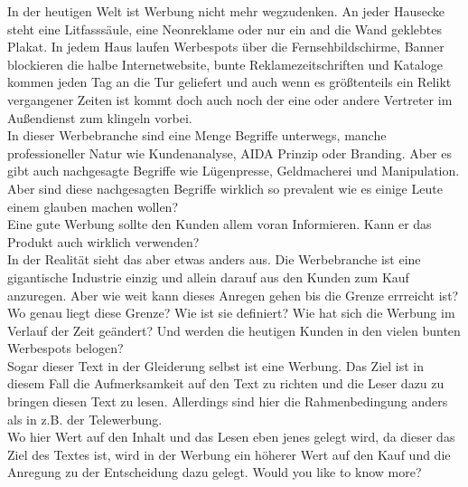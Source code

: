 \begin{refsection}
  
  
  In der heutigen Welt ist Werbung nicht mehr wegzudenken. An jeder Hausecke steht eine Litfasssäule, eine Neonreklame oder nur ein and die Wand geklebtes Plakat. In jedem Haus laufen Werbespots über die Fernsehbildschirme, Banner blockieren die halbe Internetwebsite, bunte Reklamezeitschriften und Kataloge kommen jeden Tag an die Tur geliefert und auch wenn es größtenteils ein Relikt vergangener Zeiten ist kommt doch auch noch der eine oder andere Vertreter im Außendienst zum klingeln vorbei.\\
  In dieser Werbebranche sind eine Menge Begriffe unterwegs, manche professioneller Natur wie Kundenanalyse, AIDA Prinzip oder Branding. Aber es gibt auch nachgesagte Begriffe wie Lügenpresse, Geldmacherei und Manipulation. Aber sind diese nachgesagten Begriffe wirklich so prevalent wie es einige Leute einem glauben machen wollen?\\
  Eine gute Werbung sollte den Kunden allem voran Informieren. Kann er das Produkt auch wirklich verwenden?\\

  In der Realität sieht das aber etwas anders aus. Die Werbebranche ist eine gigantische Industrie einzig und allein darauf aus den Kunden zum Kauf anzuregen. Aber wie weit kann dieses Anregen gehen bis die Grenze errreicht ist? Wo genau liegt diese Grenze? Wie ist sie definiert? Wie hat sich die Werbung im Verlauf der Zeit geändert? Und werden die heutigen Kunden in den vielen bunten Werbespots belogen?\\
  Sogar dieser Text in der Gleiderung selbst ist eine Werbung. Das Ziel ist in diesem Fall die Aufmerksamkeit auf den Text zu richten und die Leser dazu zu bringen diesen Text zu lesen. Allerdings sind hier die Rahmenbedingung anders als in z.B. der Telewerbung.\\
  Wo hier Wert auf den Inhalt und das Lesen eben jenes gelegt wird, da dieser das Ziel des Textes ist, wird in der Werbung ein höherer Wert auf den Kauf und die Anregung zu der Entscheidung dazu gelegt. Would you like to know more?
  \clearpage
  \printbibliography[heading=subsubbibliography]
\end{refsection}
\clearpage
